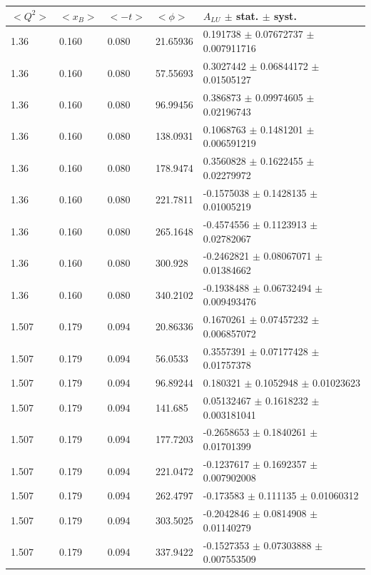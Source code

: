 \begin{table}[!h]
   \begin{center}
      \begin{tabular}{||l|l|l|l|l||}
         \hline
 $<Q^{2}>$ & $<x_{B}>$ & $<-t>$ & $<\phi>$ & $A_{LU}$ $\pm$ stat. $\pm$ syst.\\

         \hline
           1.36 & 0.160 & 0.080 & 21.65936  & 0.191738   $\pm$ 0.07672737  
$\pm$  0.007911716  \\
           1.36 & 0.160 & 0.080 &  57.55693  & 0.3027442  $\pm$ 0.06844172  $\pm$  0.01505127  \\
           1.36 & 0.160 & 0.080 &  96.99456  & 0.386873   $\pm$ 0.09974605  $\pm$  0.02196743  \\
           1.36 & 0.160 & 0.080 &  138.0931  & 0.1068763  $\pm$ 0.1481201   $\pm$  0.006591219 \\
           1.36 & 0.160 & 0.080 &  178.9474  & 0.3560828  $\pm$ 0.1622455   $\pm$  0.02279972  \\
           1.36 & 0.160 & 0.080 &  221.7811  & -0.1575038 $\pm$ 0.1428135   $\pm$  0.01005219  \\
           1.36 & 0.160 & 0.080 &  265.1648  & -0.4574556 $\pm$ 0.1123913   $\pm$  0.02782067  \\
           1.36 & 0.160 & 0.080 &  300.928   & -0.2462821 $\pm$  0.08067071 $\pm$   0.01384662 \\
           1.36 & 0.160 & 0.080 &  340.2102  & -0.1938488 $\pm$ 0.06732494  $\pm$  0.009493476 \\
                                                                                               
                                                                                               
         \hline
           1.507 & 0.179 & 0.094 & 20.86336 &  0.1670261  $\pm$ 0.07457232  
$\pm$  0.006857072 \\
           1.507 & 0.179 & 0.094 &  56.0533  & 0.3557391   $\pm$ 0.07177428  $\pm$  0.01757378 \\
           1.507 & 0.179 & 0.094 &  96.89244 &  0.180321   $\pm$ 0.1052948   $\pm$  0.01023623 \\
           1.507 & 0.179 & 0.094 &  141.685  & 0.05132467  $\pm$ 0.1618232   $\pm$  0.003181041\\
           1.507 & 0.179 & 0.094 &  177.7203 &  -0.2658653 $\pm$ 0.1840261   $\pm$  0.01701399 \\
           1.507 & 0.179 & 0.094 &  221.0472 &  -0.1237617 $\pm$ 0.1692357   $\pm$  0.007902008\\
           1.507 & 0.179 & 0.094 &  262.4797 &  -0.173583  $\pm$ 0.111135    $\pm$  0.01060312 \\
           1.507 & 0.179 & 0.094 & 303.5025 &  -0.2042846 $\pm$ 0.0814908   $\pm$  0.01140279  \\
           1.507 & 0.179 & 0.094 & 337.9422 &  -0.1527353 $\pm$ 0.07303888  $\pm$  0.007553509 \\
                                                                                               

\end{tabular}
\end{center}
\end{table}
